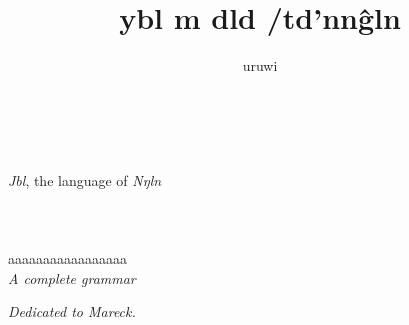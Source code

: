 \documentclass{book}
\title{\bs{}ybl m dld /td'\bs{}nn\^gln}
\author{uruwi}
\newcommand{\lname}{Jbl}
\begin{document}
\pagecolor{GreenYellow!25}

\begin{titlepage}
    \makeatletter
    \begin{center}
        {\color{Orchid} \hprule \vspace{1.5ex} \\}
        {\Huge \kardinal \textcolor{Plum}{\@title}\\}
        {\large \textit{\lname}, the language of \textit{Nŋln} \\}
        {\color{Orchid} \hprule \vspace{1.5ex} \\}
        \vspace{1.5cm}
        {\Large\bfseries \@author}\\[5pt]
        \vspace{2cm}
         \\
        {aaaaaaaaaaaaaaaaa} \\[5pt]
        \emph{A complete grammar}\\[2cm]
        \vfill
        \vfill
        {\@date}
    \end{center}
    \makeatother
\end{titlepage}

\pagecolor{GreenYellow!15}

\begin{center}
    \textit{Dedicated to Mareck.}
\end{center}
\end{document}

